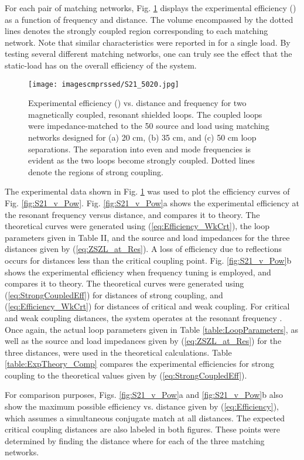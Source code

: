 \documentclass[journal]{IEEEtran}
\begin{document}
For each pair of matching networks, Fig. \ref{fig:S21} displays the experimental efficiency () as a function of frequency and distance. The volume encompassed by the dotted lines denotes the strongly coupled region corresponding to each matching network. Note that similar characteristics were reported in \cite{Intel} for a single load. By testing several different matching networks, one can truly see the effect that the static-load has on the overall efficiency of the system.
\begin{figure}[htbp]
    \centering
    \texttt{[image: imagescmprssed/S21\_5020.jpg]}
    \caption{Experimental efficiency () vs. distance and frequency for two magnetically coupled, resonant shielded loops. The coupled loops were impedance-matched to the 50  source and load using matching networks designed for (a) 20 cm, (b) 35 cm, and (c) 50 cm loop separations. The separation into even and mode frequencies is evident as the two loops become strongly coupled. Dotted lines denote the regions of strong coupling.}
    \label{fig:S21}
\end{figure}

The experimental data shown in Fig. \ref{fig:S21} was used to plot the efficiency curves of Fig. \ref{fig:S21_v_Pow}. Fig. \ref{fig:S21_v_Pow}a shows the experimental efficiency at the resonant frequency  versus distance, and compares it to theory. The theoretical curves were generated using (\ref{eq:Efficiency_WkCrt}), the loop parameters given in Table II, and the source and load impedances for the three distances given by (\ref{eq:ZSZL_at_Res}). A loss of efficiency due to reflections occurs for distances less than the critical coupling point. Fig. \ref{fig:S21_v_Pow}b shows the experimental efficiency when frequency tuning is employed, and compares it to theory. The theoretical curves were generated using (\ref{eq:StrongCoupledEff}) for distances of strong coupling, and (\ref{eq:Efficiency_WkCrt}) for distances of critical and weak coupling. For critical and weak coupling distances, the system operates at the resonant frequency . Once again, the actual loop parameters given in Table \ref{table:LoopParameters}, as well as the source and load impedances given by (\ref{eq:ZSZL_at_Res}) for the three distances, were used in the theoretical calculations. Table \ref{table:ExpTheory_Comp} compares the experimental efficiencies for strong coupling to the theoretical values given by (\ref{eq:StrongCoupledEff}).

For comparison purposes, Figs. \ref{fig:S21_v_Pow}a and \ref{fig:S21_v_Pow}b also show the maximum possible efficiency vs. distance given by (\ref{eq:Efficiency}), which assumes a simultaneous conjugate match at all distances. The expected critical coupling distances are also labeled in both figures. These points were determined by finding the distance where  for each of the three matching networks.
\end{document}
